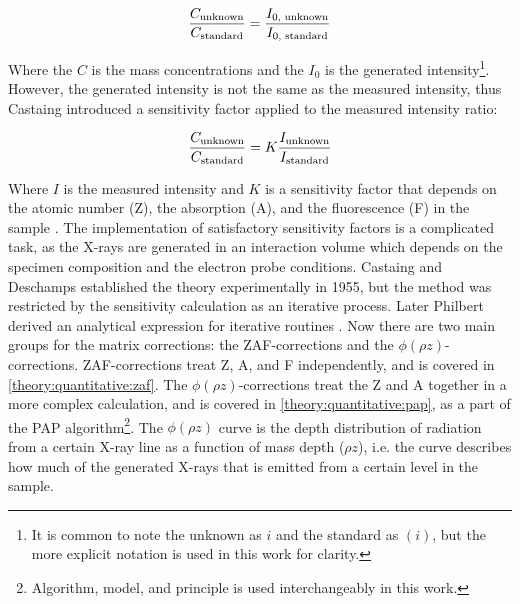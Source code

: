 
\begin{equation}
    \label{eq:theory:quantitative:castaing_generated}
    \frac{C_\textnormal{unknown}}{C_\textnormal{standard}} = \frac{I_{0\textnormal{, unknown}}}{I_{0\textnormal{, standard}}}
\end{equation}

Where the $C$ is the mass concentrations and the $I_0$ is the generated intensity\footnote{It is common to note the unknown as $i$ and the standard as $(i)$, but the more explicit notation is used in this work for clarity.}.
However, the generated intensity is not the same as the measured intensity, thus Castaing introduced a sensitivity factor applied to the measured intensity ratio:


\begin{equation}
    \label{eq:theory:quantitative:castaing_measured}
    \frac{C_\textnormal{unknown}}{C_\textnormal{standard}} = K \frac{I_\textnormal{unknown}}{I_\textnormal{standard}}
\end{equation}

Where $I$ is the measured intensity and $K$ is a sensitivity factor that depends on the atomic number (Z), the absorption (A), and the fluorescence (F) in the sample \cite{goldstein_scanning_2018,williams_carter_tem_2009}.
The implementation of satisfactory sensitivity factors is a complicated task, as the X-rays are generated in an interaction volume which depends on the specimen composition and the electron probe conditions.
Castaing and Deschamps established the theory experimentally in 1955, but the method was restricted by the sensitivity calculation as an iterative process. %
Later Philbert derived an analytical expression for iterative routines \cite{philbert_1963}.
Now there are two main groups for the matrix corrections: the ZAF-corrections and the $\phi(\rho z)$-corrections.
ZAF-corrections treat Z, A, and F independently, and is covered in \cref{theory:quantitative:zaf}.
The $\phi(\rho z)$-corrections treat the Z and A together in a more complex calculation, and is covered in \cref{theory:quantitative:pap}, as a part of the PAP algorithm\footnote{Algorithm, model, and principle is used interchangeably in this work.}.
The $\phi(\rho z)$ curve is the depth distribution of radiation from a certain X-ray line as a function of mass depth ($\rho z$), i.e. the curve describes how much of the generated X-rays that is emitted from a certain level in the sample.


